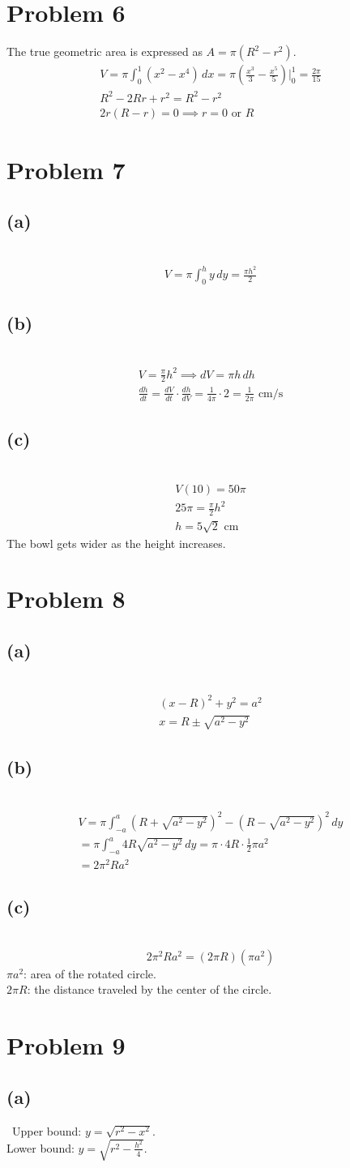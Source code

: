 \documentclass[12pt]{article}
\newcommand{\tor}{\text{ or }}
\newcommand{\problem}[1]{\section{Problem #1}}
\newcommand{\subproblem}[1]{\subsection{(#1)} \,}
\begin{document}
\problem{6}
The true geometric area is expressed as $A=\pi (R^2-r^2)$.
\begin{gather*}
    V=\pi \int_0^1 (x^2-x^4)\, dx = \pi (\frac{x^3}{3}-\frac{x^5}{5})\Big|^1_0=\boxed{\frac{2\pi}{15}}\\
    R^2-2Rr+r^2=R^2-r^2\\
    2r(R-r)=0 \implies \boxed{r=0 \tor R}
\end{gather*}

\problem{7}

\subproblem{a}
\begin{gather*}
    V=\pi \int_0^{h } y\, dy=  \boxed{\frac{\pi h^2}{2}}
\end{gather*}

\subproblem{b}
\begin{gather*}
    V=\frac{\pi}{2}h^2\implies dV=\pi h \, dh\\
    \frac{dh}{dt}=\frac{dV}{dt}\cdot \frac{dh}{dV}=\frac{1}{4\pi}\cdot 2=\boxed{\frac{1}{2\pi} \text{ cm/s}}
\end{gather*}

\subproblem{c}
\begin{gather*}
    V(10)=50\pi  \\
    25\pi =\frac{\pi}{2}h^2\\
    h=\boxed{5\sqrt{2}\text{ cm}}
\end{gather*}
The bowl gets wider as the height increases.

\problem{8}

\subproblem{a}
\begin{gather*}
    (x-R)^2+y^2=a^2\\
    x=\boxed{R\pm \sqrt{a^2-y^2}}
\end{gather*}

\subproblem{b}
\begin{gather*}
    V=\pi \int_{-a}^a (R+ \sqrt{a^2-y^2})^2-(R- \sqrt{a^2-y^2})^2\, dy\\
    =\pi \int_{-a}^a 4R\sqrt{a^2-y^2} \, dy = \pi \cdot 4R\cdot \frac{1}{2}\pi a^2\\
    =\boxed{2\pi ^2Ra^2}
\end{gather*}

\subproblem{c}
\[
2\pi^2Ra^2=(2\pi R) (\pi a^2)
\]
$\pi a^2$: area of the rotated circle. \\
$2\pi R$: the distance traveled by the center of the circle. 

\problem{9}

\subproblem{a}
Upper bound: $y=\sqrt{r^2-x^2}$.\\
Lower bound: $y=\sqrt{r^2-\frac{h^2}{4}}$.
\end{document}
